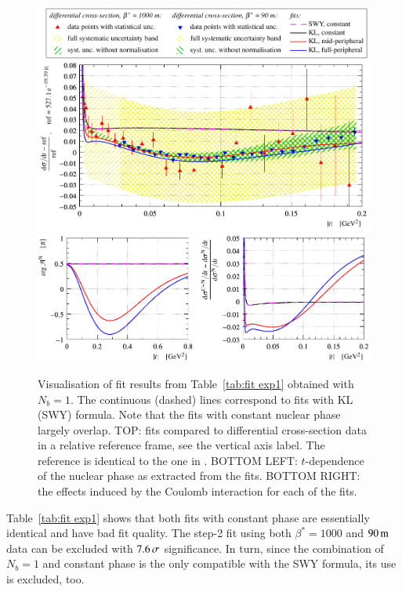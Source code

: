 \begin{figure}
\begin{center}
\includegraphics{fig/fit_exp1/t_dist_rel_with_fit.pdf}
\includegraphics{fig/fit_exp1/phase_cni_effect.pdf}
\caption{Visualisation of fit results from Table~\ref{tab:fit exp1} obtained with $N_b=1$. The continuous (dashed) lines correspond to fits with KL (SWY) formula. Note that the fits with constant nuclear phase largely overlap.
TOP: fits compared to differential cross-section data in a relative reference frame, see the vertical axis label. The reference is identical to the one in \cite{8tev-90m}. 
BOTTOM LEFT: $t$-dependence of the nuclear phase as extracted from the fits.
BOTTOM RIGHT: the effects induced by the Coulomb interaction for each of the fits.
}%
\label{fig:fit exp1}
\end{center}
\end{figure}

Table~\ref{tab:fit exp1} shows that both fits with constant phase are essentially identical and have bad fit quality. The step-2 fit using both $\beta^*=1000$ and $90\,{\rm m}$ data can be excluded with $7.6\,{\rm \sigma}$ significance. In turn, since the combination of $N_b=1$ and constant phase is the only compatible with the SWY formula, its use is excluded, too.


